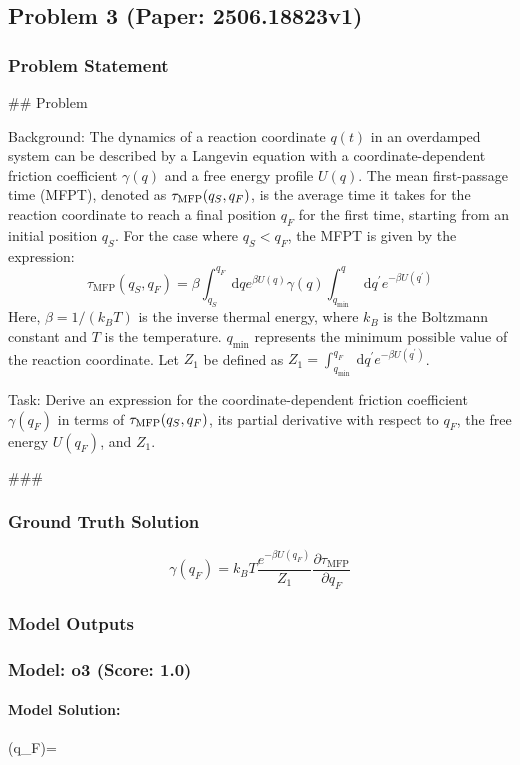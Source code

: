 \documentclass[10pt]{article}
\begin{document}
\newpage
\subsection*{Problem 3 (Paper: 2506.18823v1)}
\subsubsection*{Problem Statement}
## Problem

Background:
The dynamics of a reaction coordinate $q(t)$ in an overdamped system can be described by a Langevin equation with a coordinate-dependent friction coefficient $\gamma(q)$ and a free energy profile $U(q)$. The mean first-passage time (MFPT), denoted as $\tau_{\rm{MFP}}(q_S, q_F)$, is the average time it takes for the reaction coordinate to reach a final position $q_F$ for the first time, starting from an initial position $q_S$. For the case where $q_S < q_F$, the MFPT is given by the expression:
$$
\tau_{\text {MFP}}\left(q_S, q_F\right)=\beta \int_{q_S}^{q_F} \mathrm{~d} q e^{\beta U(q)} \gamma(q) \int_{q_{\min }}^q \mathrm{~d} q^{\prime} e^{-\beta U\left(q^{\prime}\right)}
$$
Here, $\beta = 1/(k_B T)$ is the inverse thermal energy, where $k_B$ is the Boltzmann constant and $T$ is the temperature. $q_{\min}$ represents the minimum possible value of the reaction coordinate. Let $Z_1$ be defined as $Z_1 = \int_{q_{\min }}^{q_F} \mathrm{~d} q^{\prime} e^{-\beta U\left(q^{\prime}\right)}$.

Task:
Derive an expression for the coordinate-dependent friction coefficient $\gamma(q_F)$ in terms of $\tau_{\rm{MFP}}(q_S, q_F)$, its partial derivative with respect to $q_F$, the free energy $U(q_F)$, and $Z_1$.

###

\subsubsection*{Ground Truth Solution}
\[ \boxed{\gamma(q_F) = k_B T \frac{e^{-\beta U(q_F)}}{Z_1} \frac{\partial \tau_{\mathrm{MFP}}}{\partial q_F}} \]

\subsubsection*{Model Outputs}
\subsubsection*{Model: o3 (Score: 1.0)}
\paragraph*{Model Solution:}
\;
\gamma(q_F)=
\;
\;
\end{document}
